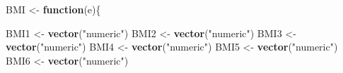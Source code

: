 \documentclass[]{article}
\newenvironment{Shaded}{\begin{snugshade}}{\end{snugshade}}
\newcommand{\KeywordTok}[1]{\textcolor[rgb]{0.13,0.29,0.53}{\textbf{#1}}}
\newcommand{\StringTok}[1]{\textcolor[rgb]{0.31,0.60,0.02}{#1}}
\newcommand{\ControlFlowTok}[1]{\textcolor[rgb]{0.13,0.29,0.53}{\textbf{#1}}}
\newcommand{\NormalTok}[1]{#1}
\begin{document}
\begin{Shaded}
\begin{Highlighting}[]
\NormalTok{BMI <-}\StringTok{ }\ControlFlowTok{function}\NormalTok{(e)\{}
  
\NormalTok{BMI1 <-}\StringTok{ }\KeywordTok{vector}\NormalTok{(}\StringTok{"numeric"}\NormalTok{)}
\NormalTok{BMI2 <-}\StringTok{ }\KeywordTok{vector}\NormalTok{(}\StringTok{"numeric"}\NormalTok{)}
\NormalTok{BMI3 <-}\StringTok{ }\KeywordTok{vector}\NormalTok{(}\StringTok{"numeric"}\NormalTok{)}
\NormalTok{BMI4 <-}\StringTok{ }\KeywordTok{vector}\NormalTok{(}\StringTok{"numeric"}\NormalTok{)}
\NormalTok{BMI5 <-}\StringTok{ }\KeywordTok{vector}\NormalTok{(}\StringTok{"numeric"}\NormalTok{)}
\NormalTok{BMI6 <-}\StringTok{ }\KeywordTok{vector}\NormalTok{(}\StringTok{"numeric"}\NormalTok{)}


\end{Highlighting}
\end{Shaded}
\end{document}
